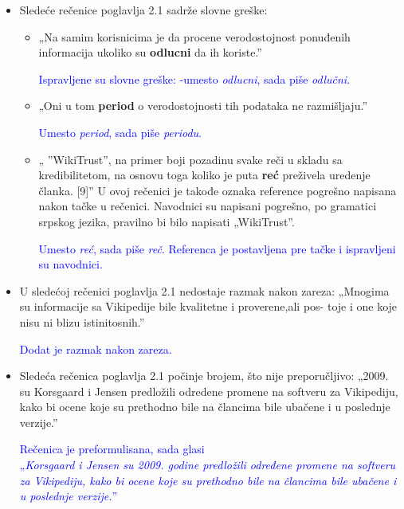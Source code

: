 \documentclass[a4paper]{report}
\newcommand{\odgovor}[1]{\textcolor{blue}{#1}}
\begin{document}
\begin{itemize}
    \item Sledeće rečenice poglavlja 2.1 sadrže slovne greške:
    \begin{itemize}
        \item  „Na samim korisnicima je da procene verodostojnost ponuđenih informacija ukoliko su \textbf{odlucni} da ih koriste.”
       
        \odgovor{Ispravljene su slovne greške: -umesto \textit{odlucni}, sada piše \textit{odlučni}.}
    
	\end{itemize}
    \begin{itemize}
        \item  „Oni u tom \textbf{period} o verodostojnosti tih podataka ne razmišljaju.”
        
        \odgovor{Umesto \textit{period}, sada piše \textit{periodu}.}
        
    \end{itemize}
    \begin{itemize}
        \item  „ ”WikiTrust”, na primer boji pozadinu
svake reči u skladu sa kredibilitetom, na osnovu toga koliko je puta \textbf{reć} preživela uredenje članka. [9]”\newline
U ovoj rečenici je takođe oznaka reference pogrešno napisana nakon tačke u rečenici. Navodnici su napisani pogrešno, po gramatici srpskog jezika, pravilno bi bilo napisati „WikiTrust”.
	
	\odgovor{Umesto \textit{reć}, sada piše \textit{reč}. Referenca je postavljena pre tačke i ispravljeni su navodnici.}
	
    \end{itemize}
\end{itemize}
\begin{itemize}
    \item U sledećoj rečenici poglavlja 2.1 nedostaje razmak nakon zareza:\newline
    „Mnogima su informacije sa Vikipedije bile kvalitetne i proverene,ali pos-
toje i one koje nisu ni blizu istinitosnih.”
	
	\odgovor{Dodat je razmak nakon zareza.}
	
\end{itemize}
\begin{itemize}
    \item Sledeća rečenica poglavlja 2.1 počinje brojem, što nije preporučljivo: \newline
    „2009. su Korsgaard i Jensen
predložili odredene promene na softveru za Vikipediju, kako bi ocene koje
su prethodno bile na člancima bile ubačene i u poslednje verzije.”
	
	\odgovor{Rečenica je preformulisana, sada glasi \\„\textit{Korsgaard i Jensen su 2009. godine predložili određene promene na softveru za Vikipediju, kako bi ocene koje su prethodno bile na člancima bile ubačene i u poslednje verzije.}”}
	
\end{itemize}
\end{document}
